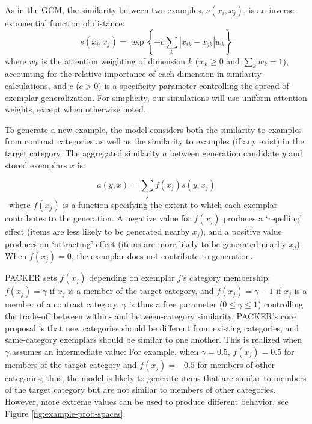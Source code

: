 \documentclass[10pt,letterpaper]{article}
\begin{document}
As in the GCM, the similarity between two examples, $s\left(x_i, x_j\right)$, is an inverse-exponential function of distance:
\begin{equation}
  s\left(x_i,x_j\right) = \exp \left\{ -c \sum_{k}{ \left| x_{ik} - x_{jk} \right|}w_k \right\}
  \label{eq:similarity}
\end{equation}
where $w_k$ is the attention weighting of dimension $k$ ($w_k \geq 0$ and $\sum_k{w_k} = 1$), accounting for the relative importance of each dimension in similarity calculations, and $c$ ($c>0$) is a specificity parameter controlling the spread of exemplar generalization. For simplicity, our simulations will use uniform attention weights, except when otherwise noted.  

To generate a new example, the model considers both the similarity to examples from contrast categories as well as the similarity to examples (if any exist) in the target category. The aggregated similarity $a$ between generation candidate $y$ and stored exemplars $x$ is:

\begin{equation}
  a(y, x) = \sum_j{f(x_j) s(y, x_j)}
  \label{eq:aggregation}
\end{equation}
\
where $f(x_j)$ is a function specifying the extent to which each exemplar contributes to the generation. A negative value for $f(x_j)$ produces a `repelling' effect (items are less likely to be generated nearby $x_j$), and a positive value produces an `attracting' effect (items are more likely to be generated nearby $x_j$). When $f(x_j)=0$, the exemplar does not contribute to generation. 

PACKER sets $f(x_j)$ depending on exemplar $j$'s category membership: $f(x_j) = \gamma$ if $x_j$ is a member of the target category, and $f(x_j) = \gamma - 1$ if $x_j$ is a member of a contrast category. $\gamma$ is thus a free parameter ($0 \leq \gamma \leq 1$) controlling the trade-off between within- and between-category similarity. PACKER's core proposal is that new categories should be different from existing categories, and same-category exemplars should be similar to one another. This is realized when $\gamma$ assumes an intermediate value: For example, when $\gamma = 0.5$, $f(x_j) = 0.5$ for members of the target category and $f(x_j) = -0.5$ for members of other categories; thus, the model is likely to generate items that are similar to members of the target category but are not similar to members of other categories. However, more extreme values can be used to produce different behavior, see Figure \ref{fig:example-prob-spaces}.
\end{document}
